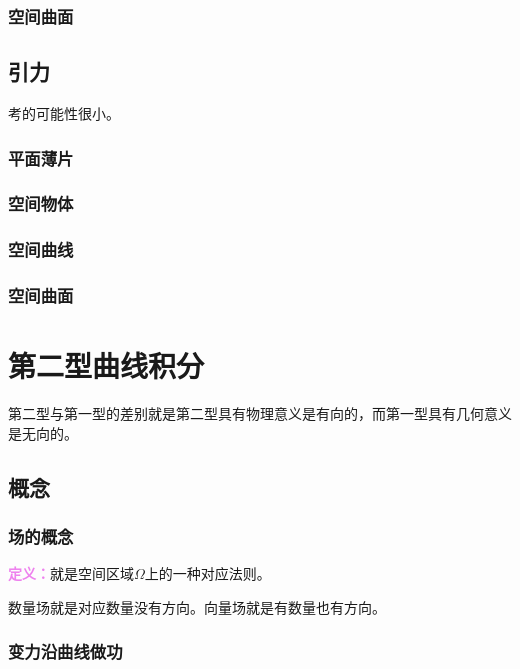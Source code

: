 \documentclass[UTF8, 12pt]{ctexart}
\begin{document}
\subsubsection{空间曲面}

\subsection{引力}

考的可能性很小。

\subsubsection{平面薄片}

\subsubsection{空间物体}

\subsubsection{空间曲线}

\subsubsection{空间曲面}

\section{第二型曲线积分}

第二型与第一型的差别就是第二型具有物理意义是有向的，而第一型具有几何意义是无向的。

\subsection{概念}

\subsubsection{场的概念}

\textcolor{violet}{\textbf{定义：}}就是空间区域$\Omega$上的一种对应法则。

数量场就是对应数量没有方向。向量场就是有数量也有方向。

\subsubsection{变力沿曲线做功}
\end{document}
